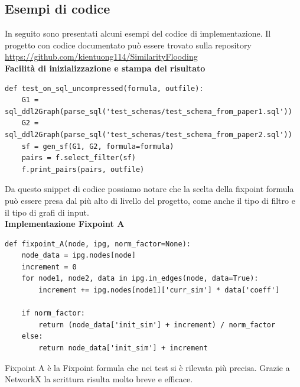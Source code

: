 \documentclass[a4paper,10pt]{article}
\begin{document}
\newpage
\begin{appendices}
\section{Esempi di codice}

In seguito sono presentati alcuni esempi del codice di implementazione. Il progetto con codice documentato può essere trovato sulla repository \url{https://github.com/kientuong114/SimilarityFlooding}\\


\textbf{Facilità di inizializzazione e stampa del risultato}
\begin{verbatim}
def test_on_sql_uncompressed(formula, outfile):
    G1 = sql_ddl2Graph(parse_sql('test_schemas/test_schema_from_paper1.sql'))
    G2 = sql_ddl2Graph(parse_sql('test_schemas/test_schema_from_paper2.sql'))
    sf = gen_sf(G1, G2, formula=formula)
    pairs = f.select_filter(sf)
    f.print_pairs(pairs, outfile)
\end{verbatim}
Da questo snippet di codice possiamo notare che la scelta della fixpoint formula può essere presa dal più alto di livello del progetto, come anche il tipo di filtro e il tipo di grafi di input.\\

\textbf{Implementazione Fixpoint A}
\begin{verbatim}
def fixpoint_A(node, ipg, norm_factor=None):
    node_data = ipg.nodes[node]
    increment = 0
    for node1, node2, data in ipg.in_edges(node, data=True):
        increment += ipg.nodes[node1]['curr_sim'] * data['coeff']

    if norm_factor:
        return (node_data['init_sim'] + increment) / norm_factor
    else:
        return node_data['init_sim'] + increment
\end{verbatim}

Fixpoint A è la Fixpoint formula che nei test si è rilevata più precisa. Grazie a NetworkX la scrittura risulta molto breve e efficace.

\end{appendices}



\newpage


\end{document}
